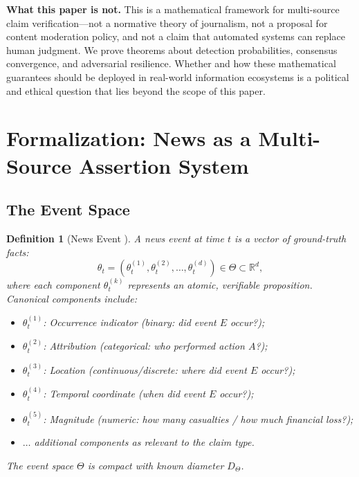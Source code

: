 \documentclass[11pt,a4paper]{article}
\newtheorem{definition}[theorem]{Definition}
\theoremstyle{definition}
\newcommand{\R}{\mathbb{R}}
\newcommand{\newsState}{\Theta}
\begin{document}
\textbf{What this paper is not.} This is a mathematical framework for multi-source claim verification---not a normative theory of journalism, not a proposal for content moderation policy, and not a claim that automated systems can replace human judgment. We prove theorems about detection probabilities, consensus convergence, and adversarial resilience. Whether and how these mathematical guarantees should be deployed in real-world information ecosystems is a political and ethical question that lies beyond the scope of this paper.

\section{Formalization: News as a Multi-Source Assertion System }
\label{sec:formalization}

\subsection{The Event Space }

\begin{definition}[News Event ]
\label{def:event}
A news event at time $t$ is a vector of ground-truth facts:
\begin{equation}
    \theta_t = (\theta_t^{(1)}, \theta_t^{(2)}, \ldots, \theta_t^{(d)}) \in \newsState \subset \R^d,
    \label{eq:event}
\end{equation}
where each component $\theta_t^{(k)}$ represents an atomic, verifiable proposition. Canonical components include:
\begin{itemize}
    \item $\theta_t^{(1)}$: Occurrence indicator (binary: did event $E$ occur?);
    \item $\theta_t^{(2)}$: Attribution (categorical: who performed action $A$?);
    \item $\theta_t^{(3)}$: Location (continuous/discrete: where did event $E$ occur?);
    \item $\theta_t^{(4)}$: Temporal coordinate (when did event $E$ occur?);
    \item $\theta_t^{(5)}$: Magnitude (numeric: how many casualties / how much financial loss?);
    \item $\dots$ additional components as relevant to the claim type.
\end{itemize}
The event space $\newsState$ is compact with known diameter $D_\Theta$.
\end{definition}
\end{document}
